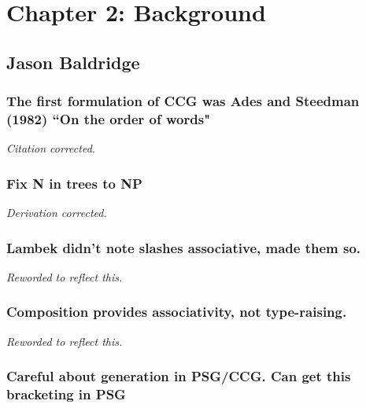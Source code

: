 % 
% 
% 
% 
% 
% 
% 

\chapter{Chapter 2: Background}

\section{Jason Baldridge}

\subsection{The first formulation of CCG was Ades and Steedman (1982) ``On the
order of words"}

\emph{Citation corrected.}

\subsection{Fix N in trees to NP}

\emph{Derivation corrected.}

\subsection{Lambek didn't note slashes associative, made them so.}

\emph{Reworded to reflect this.}

\subsection{Composition provides associativity, not type-raising.}

\emph{Reworded to reflect this.}

\subsection{Careful about generation in PSG/CCG. Can get this bracketing in PSG}

